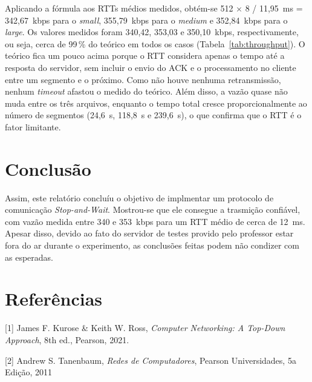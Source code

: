 \documentclass[11pt,a4paper]{article}
\begin{document}
Aplicando a fórmula aos RTTs médios medidos, obtém-se 512 $\times$ 8 / 11,95~ms
= 342,67~kbps para o \textit{small}, 355,79~kbps para o \textit{medium} e 352,84~kbps
para o \textit{large}. Os valores medidos foram 340,42, 353,03 e 350,10~kbps,
respectivamente, ou seja, cerca de 99\,\% do teórico em todos os casos
(Tabela~\ref{tab:throughput}). O teórico fica um pouco acima porque o RTT considera
apenas o tempo até a resposta do servidor, sem incluir o envio do ACK e o processamento
no cliente entre um segmento e o próximo. Como não houve nenhuma retransmissão, nenhum
\textit{timeout} afastou o medido do teórico. Além disso, a vazão quase não muda entre os
três arquivos, enquanto o tempo total cresce proporcionalmente ao número de segmentos
(24,6~s, 118,8~s e 239,6~s), o que confirma que o RTT é o fator limitante.

\section{Conclusão}

Assim, este relatório concluíu o objetivo de implmentar um protocolo de comunicação \textit{Stop-and-Wait}. Mostrou-se que ele consegue a trasmição confiável,
com vazão medida entre 340 e 353~kbps para um RTT médio de cerca de 12~ms.
Apesar disso, devido ao fato do servidor de testes provido pelo professor estar fora do ar durante o experimento, as conclusões feitas podem não condizer com as esperadas.

\section{Referências}

\begin{referencias}
\item {[1]} James F. Kurose \& Keith W. Ross, \emph{Computer Networking: A Top-Down Approach}, 8th ed., Pearson, 2021.

\item {[2]} Andrew S. Tanenbaum, \emph{Redes de Computadores}, Pearson Universidades, 5a Edição, 2011
\end{referencias}
\end{document}
